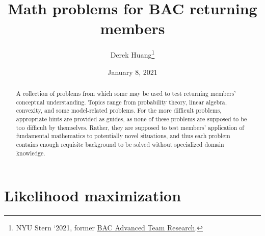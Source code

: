\documentclass{article}
\title{Math problems for BAC returning members}
\author{
    Derek Huang\thanks{
        NYU Stern `2021, former \href{
            https://sternbac.org/insightteam.html
        }{BAC Advanced Team Research}.
    }
}
\date{January 8, 2021}
\numberwithin{equation}{section}
\begin{document}
\maketitle

\begin{abstract}
    A collection of problems from which some may be used to test returning
    members' conceptual understanding. Topics range from probability theory,
    linear algebra, convexity, and some model-related problems. For the more
    difficult problems, appropriate hints are provided as guides, as none of
    these problems are supposed to be too difficult by themselves. Rather, they
    are supposed to test members' application of fundamental mathematics to
    potentially novel situations, and thus each problem contains enough
    requisite background to be solved without specialized domain knowledge.
\end{abstract}

\section{Likelihood maximization}
\end{document}
